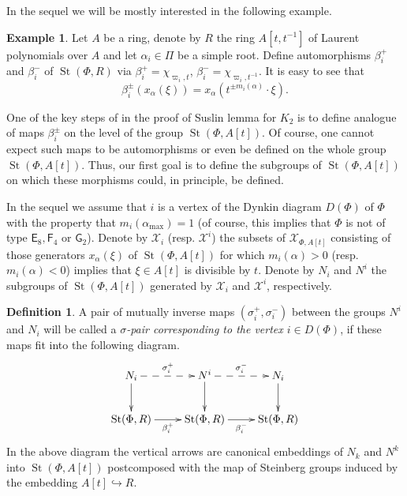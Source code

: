 \documentclass[oneside, 10pt]{amsart}
\DeclareMathOperator{\St}{St}
\DeclareMathOperator{\GL}{GL}
\newcommand{\rE}{\mathsf{E}}
\newcommand{\rF}{\mathsf{F}}
\newcommand{\rG}{\mathsf{G}}
\numberwithin{equation}{section}
\numberwithin{lemma}{section}
\theoremstyle{definition}
\newtheorem{dfn}[lemma]{Definition}
\newtheorem{example}[lemma]{Example}
\theoremstyle{remark}
\begin{document}
In the sequel we will be mostly interested in the following example.
\begin{example}
Let $A$ be a ring, denote by $R$ the ring $A[t, t^{-1}]$ of Laurent polynomials over $A$ and let $\alpha_i \in \Pi$ be a simple root.
Define automorphisms $\beta_i^+$ and $\beta_i^-$ of $\St(\Phi, R)$ via $\beta_i^+ = \chi_{\varpi_i, t}$, $\beta_i^- = \chi_{\varpi_i, t^{-1}}$.
It is easy to see that
\begin{equation}\label{eq:sigma_act} \beta_i^\pm(x_\alpha(\xi)) = x_\alpha(t^{\pm m_i(\alpha)} \cdot \xi).\end{equation}
\end{example}

One of the key steps of in the proof of Suslin lemma for $K_2$ is to define analogue of maps $\beta_i^\pm$ on the level of the group $\St(\Phi, A[t])$.
Of course, one cannot expect such maps to be automorphisms or even be defined on the whole group $\St(\Phi, A[t])$.
Thus, our first goal is to define the subgroups of $\St(\Phi, A[t])$ on which these morphisms could, in principle, be defined.

In the sequel we assume that $i$ is a vertex of the Dynkin diagram $D(\Phi)$ of $\Phi$ with the property that $m_i(\alpha_{\max})=1$ (of course, this implies that $\Phi$ is not of type $\rE_8, \rF_4$ or $\rG_2$).
Denote by $\mathcal{X}_i$ (resp. $\mathcal{X}^i$) the subsets of $\mathcal{X}_{\Phi, A[t]}$ consisting of those generators $x_{\alpha}(\xi)$ of $\St(\Phi, A[t])$ for which 
$m_i(\alpha) > 0$ (resp. $m_i(\alpha)<0$) implies that $\xi \in A[t]$ is divisible by $t$.
Denote by $N_i$ and $N^i$ the subgroups of $\St(\Phi, A[t])$ generated by $\mathcal{X}_i$ and $\mathcal{X}^i$, respectively.

\begin{dfn} A pair of mutually inverse maps $(\sigma_i^+, \sigma_i^-)$ between the groups $N^i$ and $N_i$ will be called a {\it $\sigma$-pair corresponding to the vertex $i\in D(\Phi)$},
 if these maps fit into the following diagram.
\begin{equation} \label{eq:sigma-diagram}
\xymatrix{ N_i\ar@{-->}[r]^{\sigma_i^+}\ar[d] & N^i \ar[d] \ar@{-->}[r]^{\sigma_i^-} & N_i \ar[d] \\ 
          \St(\Phi, R) \ar@<-0.0ex>[r]_{\beta_i^+} & \St(\Phi, R) \ar@<-0.0ex>[r]_{\beta_i^-} & \St(\Phi, R)} 
\end{equation}
In the above diagram the vertical arrows are canonical embeddings of $N_k$ and $N^k$ into $\St(\Phi, A[t])$ postcomposed with 
 the map of Steinberg groups induced by the embedding $A[t] \hookrightarrow R$.
\end{dfn}
\end{document}
